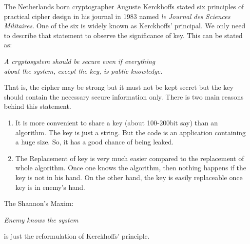 \documentclass[a4paper,12pt]{article}
\newcommand{\B}{\color{blue}}
\newcommand{\V}{\vspace{2cm}}
\begin{document}
	\noindent The Netherlands born cryptographer {\B Auguste Kerckhoffs} stated six principles of practical cipher design in his journal in 1983 named {\it le Journal des Sciences Militaires}. One of the six is widely known as Kerckhoffs' principal. We only need to describe that statement to observe the significance of key. This can be stated as: 
	\begin{center}\it A cryptosystem should be secure even if everything \\about the system, except the key, is public knowledge.\end{center}	
	\noindent That is, the cipher may be strong but it must not be kept secret but the key should contain the necessary secure information only. There is two main reasons behind this statement.
	\begin{enumerate}
		\item It is more convenient to share a key (about 100-200bit say) than an algorithm. The key is just a string. But the code is an application containing a huge size. So, it has a good chance of being leaked.
		
		\item The Replacement of key is very much easier compared to the replacement of whole algorithm. Once one knows the algorithm, then nothing happens if the key is not in his hand. On the other hand, the key is easily replaceable once key is in enemy's hand.
	\end{enumerate}
	The {\B Shannon's} Maxim: 
	\begin{center}\it Enemy knows the system\end{center} 
is just the reformulation of {\B Kerckhoffs'} principle.
\V
\end{document}
